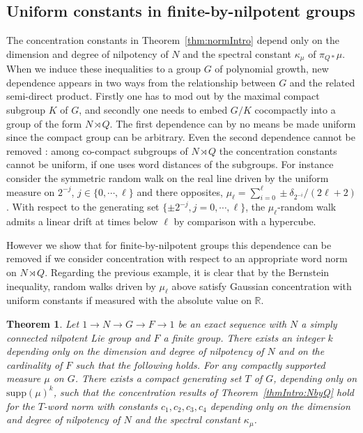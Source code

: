 \documentclass[11pt,leqno]{article}
\theoremstyle{plain}
\newtheorem{theorem}{Theorem}[section]
\theoremstyle{definition}
\theoremstyle{remark}
\numberwithin{equation}{section}
\begin{document}
\subsection{Uniform constants in finite-by-nilpotent groups}

The concentration constants in Theorem~\ref{thm:normIntro} depend only on the dimension and degree of nilpotency of $N$ and the spectral constant $\kappa_\mu$ of $\pi_{Q\ast}\mu$. When we induce these inequalities to a group $G$ of polynomial growth, new dependence appears in two ways from the relationship between $G$ and the related semi-direct product. Firstly one has to mod out by the maximal compact subgroup $K$ of $G$, and secondly one needs to embed $G/K$ cocompactly into a group of the form $N\rtimes Q$. The first dependence can by no means be made uniform since the compact group can be arbitrary. Even the second dependence cannot be removed : among co-compact subgroups of $N\rtimes Q$ the concentration constants cannot be uniform, if one uses word distances of the subgroups. For instance consider the symmetric random walk on the real line driven by the uniform measure on $2^{-j}$, $j\in\{0,\cdots,\ell\}$ and there opposites, $\mu_\ell=\sum_{i=0}^\ell \pm \delta_{2^{-i}}/(2\ell+2)$. With respect to the generating set $\{\pm2^{-j}, j=0,\cdots,\ell\}$, the $\mu_{\ell}$-random walk admits a linear drift at times below $\ell$ by comparison with a hypercube. 

However we show that for finite-by-nilpotent groups this dependence can be removed if we consider concentration with respect to an appropriate word norm on $N\rtimes Q$. Regarding the previous example, it is clear that by the Bernstein inequality, random walks driven by $\mu_\ell$ above satisfy Gaussian concentration with uniform constants if measured with the absolute value on $\mathbb{R}$.

\begin{theorem}
Let $1 \to N \to G \to F \to 1$ be an exact sequence with $N$ a simply connected nilpotent Lie group and $F$ a finite group. There exists an integer $k$ depending only on the dimension and degree of nilpotency of $N$ and on the cardinality of $F$ such that the following holds. For any compactly supported measure $\mu$ on $G$. There exists a compact generating set $T$ of $G$, depending only on $\mathrm{supp}(\mu)^k$, such that the concentration results of Theorem~\ref{thmIntro:NbyQ} hold for the $T$-word norm with constants $c_1,c_2,c_3,c_4$ depending only on the dimension and degree of nilpotency of $N$ and the spectral constant $\kappa_\mu$.
\end{theorem}
\end{document}
